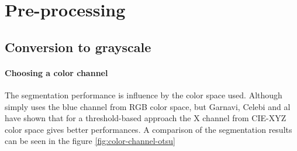 \documentclass[a4paper,10pt]{article}
\begin{document}


\section{Pre-processing}
\subsection{Conversion to grayscale}

\paragraph{Choosing a color channel}

The segmentation performance is influence by the color space used. Although~\cite{mendonca_comparison_2007} simply uses the blue channel from RGB color space, but Garnavi, Celebi and al~\cite{Garnavi2010} have shown that for a 
threshold-based approach the X channel from CIE-XYZ color space gives better performances. A comparison of the segmentation results can be seen in the figure \ref{fig:color-channel-otsu}
\end{document}
